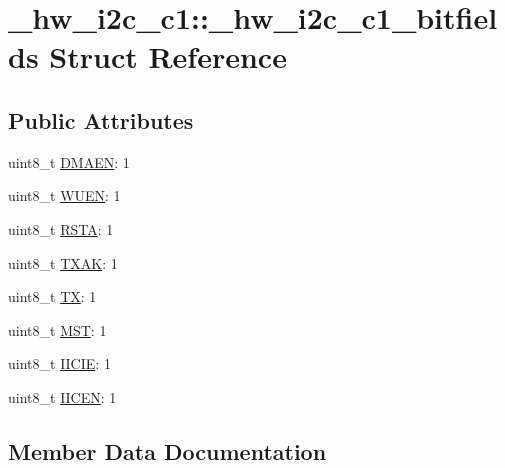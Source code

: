 \hypertarget{struct__hw__i2c__c1_1_1__hw__i2c__c1__bitfields}{}\section{\+\_\+hw\+\_\+i2c\+\_\+c1\+:\+:\+\_\+hw\+\_\+i2c\+\_\+c1\+\_\+bitfields Struct Reference}
\label{struct__hw__i2c__c1_1_1__hw__i2c__c1__bitfields}
\subsection*{Public Attributes}
\begin{DoxyCompactItemize}
\item 
uint8\+\_\+t \hyperlink{struct__hw__i2c__c1_1_1__hw__i2c__c1__bitfields_a0d4b43403754ed71f5f2fbfdf640181c}{D\+M\+A\+EN}\+: 1
\item 
uint8\+\_\+t \hyperlink{struct__hw__i2c__c1_1_1__hw__i2c__c1__bitfields_af40a673ead308a401b260272c50b502a}{W\+U\+EN}\+: 1
\item 
uint8\+\_\+t \hyperlink{struct__hw__i2c__c1_1_1__hw__i2c__c1__bitfields_acaf88c474bb863f21faae8104d641ce2}{R\+S\+TA}\+: 1
\item 
uint8\+\_\+t \hyperlink{struct__hw__i2c__c1_1_1__hw__i2c__c1__bitfields_aef52db94498e9b01206982873ddce7de}{T\+X\+AK}\+: 1
\item 
uint8\+\_\+t \hyperlink{struct__hw__i2c__c1_1_1__hw__i2c__c1__bitfields_af70939c01025083c745eecc12286ac95}{TX}\+: 1
\item 
uint8\+\_\+t \hyperlink{struct__hw__i2c__c1_1_1__hw__i2c__c1__bitfields_a98da82b171a9d6d6abf02fb7e5fbd19d}{M\+ST}\+: 1
\item 
uint8\+\_\+t \hyperlink{struct__hw__i2c__c1_1_1__hw__i2c__c1__bitfields_aea15493d93432fa87f23237025355f92}{I\+I\+C\+IE}\+: 1
\item 
uint8\+\_\+t \hyperlink{struct__hw__i2c__c1_1_1__hw__i2c__c1__bitfields_a61519ac1d48fecfc8d70f9f3550976b0}{I\+I\+C\+EN}\+: 1
\end{DoxyCompactItemize}


\subsection{Member Data Documentation}
